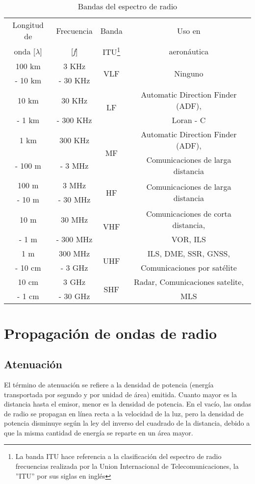 \begin{table}[h]
\centering
\begin{tabular}{|c|c|c|c|}
\hline
\rowcolor{azulclarito} Longitud de & Frecuencia & Banda & Uso en \\ 
\rowcolor{azulclarito} onda [\( \lambda \)] & [\textit{f}] & ITU\footnote{La banda ITU hace referencia a la clasificación del espectro de radio frecuencias realizada por la Union Internacional de Telecomunicaciones, la ''ITU'' por sus siglas en inglés} & aeronáutica\\ \hline
100 km & 3 KHz  & \multirow{2}{*}{VLF}  & \multirow{2}{*}{Ninguno} \\ 
 - 10 km & - 30 KHz &  & \\ \hline
10 km  & 30 KHz  & \multirow{2}{*}{LF}  & Automatic Direction Finder (ADF), \\ 
- 1 km &- 300 KHz & & Loran - C \\ \hline
1 km   & 300 KHz  & \multirow{2}{*}{MF}  & Automatic Direction Finder (ADF), \\ 
 - 100 m & - 3 MHz & & Comunicaciones de larga distancia\\ \hline
100 m   & 3 MHz & \multirow{2}{*}{HF}  & \multirow{2}{*}{Comunicaciones de larga distancia}\\ 
 - 10 m  & - 30 MHz &  & \\ \hline
10 m   & 30 MHz & \multirow{2}{*}{VHF}  & Comunicaciones de corta distancia,\\ 
- 1 m &  - 300 MHz & & VOR, ILS\\ \hline
1 m   & 300 MHz  & \multirow{2}{*}{UHF}  & ILS, DME, SSR, GNSS,\\ 
- 10 cm & - 3 GHz & & Comunicaciones por satélite\\ \hline  
10 cm  & 3 GHz& \multirow{2}{*}{SHF}  & Radar, Comunicaciones satelite,\\ 
 - 1 cm &  - 30 GHz & & MLS\\ \hline    
\end{tabular}
\caption{Bandas del espectro de radio}
\end{table}


\section{Propagación de ondas de radio}
\subsection{Atenuación}
El término de atenuación se refiere a la densidad de potencia (energía transportada por segundo y por unidad de área) emitida. Cuanto mayor es la distancia hasta el emisor, menor es la densidad de potencia. En el vacío, las ondas de radio se propagan en línea recta a la velocidad de la luz, pero la densidad de potencia disminuye según la ley del inverso del cuadrado de la distancia, debido a que la misma cantidad de energía se reparte en un área mayor.

